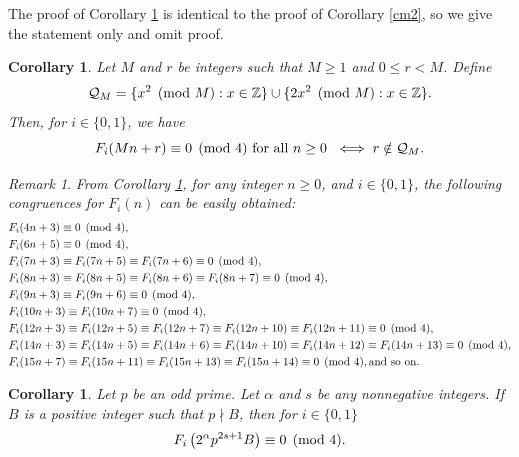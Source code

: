 \documentclass[12pt]{article}
\numberwithin{equation}{section}
\newtheorem{corollary}[theorem]{Corollary}
\theoremstyle{definition}
\theoremstyle{remark}
\newtheorem{remark}[theorem]{Remark}
\numberwithin{equation}{section}
\begin{document}
The proof of  Corollary \ref{cm4} is identical to the proof of Corollary \ref{cm2},  so we give the statement only and omit proof.
\begin{corollary}\label{cm4}Let $M$ and $r$ be integers such that  $M\geq1$ and $0\leq r<M$. Define
\begin{equation}
\mathcal Q_M
=
\{x^2\pmod M:x\in\mathbb Z\}
\cup
\{2x^2\pmod M:x\in\mathbb Z\}.\notag
\end{equation}
Then, for $i\in\{0,1\}$, we have 
\begin{equation}
F_i(Mn+r)\equiv0\pmod 4
\text{ for all $n\geq0$ }\iff
r\notin \mathcal Q_M.\notag
\end{equation}
\end{corollary}
\begin{remark}\label{r4m2}\it
From  Corollary \ref{cm4}, for any integer $n\geq 0$, and $i\in\{0,1\}$, the  following congruences  for $F_i(n)$ can be easily obtained:
\begin{align}
&F_i(4n+3)\equiv0\pmod{4}, \notag\\
&F_i(6n+5)\equiv0\pmod{4}, \notag\\
&F_i(7n+3)\equiv F_i(7n+5)\equiv F_i(7n+6)\equiv0\pmod{4},\notag\\
&F_i(8n+3)\equiv F_i(8n+5)\equiv F_i(8n+6)
\equiv F_i(8n+7)\equiv0\pmod{4}, \notag\\
&F_i(9n+3)\equiv F_i(9n+6)\equiv0\pmod{4}, \notag\\
&F_i(10n+3)\equiv F_i(10n+7)\equiv0\pmod{4}, \notag\\
&F_i(12n+3)\equiv F_i(12n+5)\equiv F_i(12n+7)
\equiv F_i(12n+10)\equiv F_i(12n+11)\equiv0\pmod{4}, \notag\\
&F_i(14n+3)\equiv F_i(14n+5)\equiv F_i(14n+6)
\equiv F_i(14n+10) \equiv F_i(14n+12)\equiv F_i(14n+13)\equiv0\pmod{4}, \notag\\
&F_i(15n+7)\equiv F_i(15n+11)\equiv F_i(15n+13)
\equiv F_i(15n+14)\equiv0\pmod{4}, \mbox{and so on.}\notag
\end{align} 
\end{remark}
\begin{corollary}
Let $p$ be an odd prime. Let $\alpha$ and $s$ be any nonnegative integers.  If $B$ is a positive integer such that $p\nmid B$, then for $i\in\{0,1\}$
\begin{equation}
F_i\left(2^\alpha p^{2s+1}B\right)\equiv0\pmod 4.\notag
\end{equation}
\end{corollary}
\end{document}
